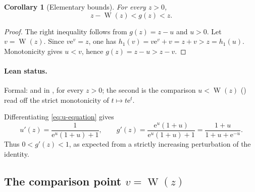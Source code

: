 \documentclass[11pt,oneside]{article}
\theoremstyle{plain}
\newtheorem{corollary}[theorem]{Corollary}
\theoremstyle{definition}
\theoremstyle{remark}
\newcommand{\W}{\operatorname{W}}
\newcommand{\e}{\mathrm{e}}
\begin{document}
\begin{corollary}[Elementary bounds]
\label{cor:bounds}
For every \(z>0\),
\begin{equation}
 z-\W(z)<g(z)<z.
 \label{eq:elementary-bounds}
\end{equation}
\end{corollary}

\begin{proof}
The right inequality follows from \(g(z)=z-u\) and \(u>0\).  Let
\(v=\W(z)\).  Since \(v\e^v=z\), one has
\(h_1(v)=v\e^v+v=z+v>z=h_1(u)\).  Monotonicity gives \(u<v\), hence
\(g(z)=z-u>z-v\).
\end{proof}

\paragraph{Lean status.}
Formal:  and
 in ,
for every \(z>0\); the second is the comparison \(u<\W(z)\)
() read off the strict monotonicity of
\(t\mapsto t\e^t\).

Differentiating \eqref{eq:u-equation} gives
\begin{equation}
 u'(z)=\frac{1}{\e^u(1+u)+1},
 \qquad
 g'(z)=\frac{\e^u(1+u)}{\e^u(1+u)+1}
      =\frac{1+u}{1+u+\e^{-u}}.
 \label{eq:gprime-exact}
\end{equation}
Thus \(0<g'(z)<1\), as expected from a strictly increasing perturbation of the
identity.

\subsection{The comparison point \texorpdfstring{\(v=\W(z)\)}{v=W(z)}}
\end{document}
